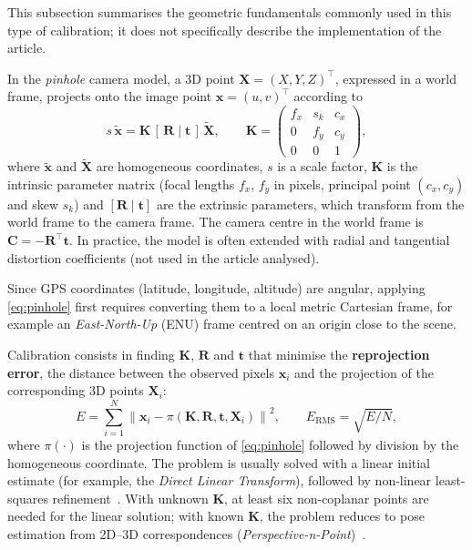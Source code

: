 This subsection summarises the geometric fundamentals commonly used in this type of calibration; it does not specifically describe the implementation of the article.

In the \textit{pinhole} camera model, a 3D point $\mathbf{X}=(X,Y,Z)^{\top}$, expressed in a world frame, projects onto the image point $\mathbf{x}=(u,v)^{\top}$ according to
\begin{equation}
    s\,\tilde{\mathbf{x}} = \mathbf{K}\,[\,\mathbf{R}\mid\mathbf{t}\,]\,\tilde{\mathbf{X}},
    \qquad
    \mathbf{K}=
    \begin{pmatrix}
        f_x & s_k & c_x\\
        0 & f_y & c_y\\
        0 & 0 & 1
    \end{pmatrix},
    \label{eq:pinhole}
\end{equation}
where $\tilde{\mathbf{x}}$ and $\tilde{\mathbf{X}}$ are homogeneous coordinates, $s$ is a scale factor, $\mathbf{K}$ is the intrinsic parameter matrix (focal lengths $f_x$, $f_y$ in pixels, principal point $(c_x,c_y)$ and skew $s_k$) and $[\mathbf{R}\mid\mathbf{t}]$ are the extrinsic parameters, which transform from the world frame to the camera frame. The camera centre in the world frame is $\mathbf{C}=-\mathbf{R}^{\top}\mathbf{t}$. In practice, the model is often extended with radial and tangential distortion coefficients (not used in the article analysed).

Since GPS coordinates (latitude, longitude, altitude) are angular, applying \eqref{eq:pinhole} first requires converting them to a local metric Cartesian frame, for example an \textit{East-North-Up} (ENU) frame centred on an origin close to the scene.

Calibration consists in finding $\mathbf{K}$, $\mathbf{R}$ and $\mathbf{t}$ that minimise the \textbf{reprojection error}, the distance between the observed pixels $\mathbf{x}_i$ and the projection of the corresponding 3D points $\mathbf{X}_i$:
\begin{equation}
    E=\sum_{i=1}^{N}\left\lVert \mathbf{x}_i-\pi\!\left(\mathbf{K},\mathbf{R},\mathbf{t},\mathbf{X}_i\right)\right\rVert^{2},
    \qquad
    E_{\mathrm{RMS}}=\sqrt{E/N},
    \label{eq:reproj}
\end{equation}
where $\pi(\cdot)$ is the projection function of \eqref{eq:pinhole} followed by division by the homogeneous coordinate. The problem is usually solved with a linear initial estimate (for example, the \textit{Direct Linear Transform}), followed by non-linear least-squares refinement~\cite{hartley2004mvg}. With unknown $\mathbf{K}$, at least six non-coplanar points are needed for the linear solution; with known $\mathbf{K}$, the problem reduces to pose estimation from 2D--3D correspondences (\textit{Perspective-n-Point})~\cite{hartley2004mvg}.


